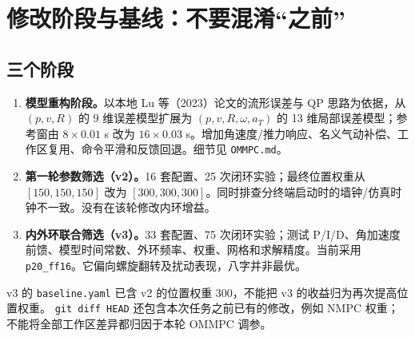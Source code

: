 \documentclass[UTF8,a4paper,11pt,fontset=fandol]{ctexart}
\newcommand{\code}[1]{{\small\nolinkurl{#1}}}
\begin{document}
\section{修改阶段与基线：不要混淆“之前”}
\subsection{三个阶段}
\begin{enumerate}
\item \textbf{模型重构阶段。}以本地 Lu 等（2023）论文的流形误差与 QP 思路为依据，从 $(p,v,R)$ 的 9 维误差模型扩展为 $(p,v,R,\omega,a_T)$ 的 13 维局部误差模型；参考窗由 $8\times0.01$ s 改为 $16\times0.03$ s。增加角速度/推力响应、名义气动补偿、工作区复用、命令平滑和反馈回退。细节见 \code{OMMPC.md}。
\item \textbf{第一轮参数筛选（v2）。}16 套配置、25 次闭环实验；最终位置权重从 $[150,150,150]$ 改为 $[300,300,300]$。同时排查分终端启动时的墙钟/仿真时钟不一致。没有在该轮修改内环增益。
\item \textbf{内外环联合筛选（v3）。}33 套配置、75 次闭环实验；测试 P/I/D、角加速度前馈、模型时间常数、外环频率、权重、网格和求解精度。当前采用 \code{p20_ff16}。它偏向螺旋翻转及扰动表现，八字并非最优。
\end{enumerate}
v3 的 \code{baseline.yaml} 已含 v2 的位置权重 300，不能把 v3 的收益归为再次提高位置权重。
\texttt{git diff HEAD} 还包含本次任务之前已有的修改，例如 NMPC 权重；不能将全部工作区差异都归因于本轮 OMMPC 调参。
\end{document}
